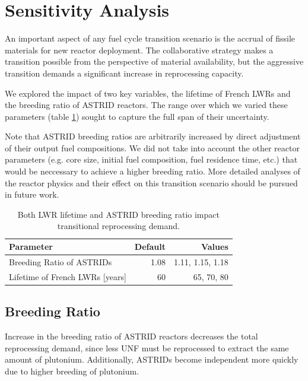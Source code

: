 \section{Sensitivity Analysis}

An important aspect of any fuel cycle transition scenario
is the accrual of fissile materials for new reactor deployment.
The collaborative strategy makes a transition possible 
from the perspective of material availability,
but the aggressive transition demands a significant increase in reprocessing capacity.

We explored the impact of two key variables, the lifetime of French \glspl{LWR} and the
breeding ratio of \gls{ASTRID} reactors. The range over which we varied these parameters (table \ref{tab:sen_par})
sought to capture the full span of their uncertainty.

Note that \gls{ASTRID} breeding ratios are arbitrarily increased
by direct adjustment of their output fuel compositions. We did not 
take into account the other reactor parameters (e.g. core size, initial
fuel composition, fuel residence time, etc.)
that would be neccessary to achieve a higher breeding ratio. More detailed analyses
of the reactor physics and their effect on this transition scenario 
should be pursued in future work.


\begin{table}[h]
    \centering
    \caption{Both \gls{LWR} lifetime and \gls{ASTRID} breeding ratio impact 
    transitional reprocessing demand.}
    \begin{tabularx}{\textwidth}{lrr}
        \hline
        \textbf{Parameter} & \textbf{Default} & \textbf{Values} \\
        \hline
        Breeding Ratio of \glspl{ASTRID} & 1.08 & 1.11, 1.15, 1.18 \\ 
        Lifetime of French \glspl{LWR} [years] & 60  & 65, 70, 80 \\
        \hline
    \end{tabularx}
    \label{tab:sen_par}
\end{table}

\subsection{Breeding Ratio}


Increase in the breeding ratio of \gls{ASTRID} reactors
decreases the total reprocessing demand, since less
\gls{UNF} must be reprocessed to extract the same amount of
plutonium. Additionally,
\glspl{ASTRID} become independent more quickly due to
higher breeding of plutonium.

